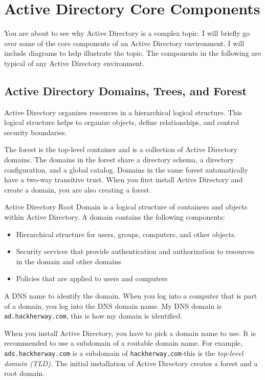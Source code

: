 \section{Active Directory Core Components}
You are about to see why Active Directory is a complex topic. I will briefly go over some of the core components of an Active Directory environment. I will include diagrams to help illustrate the topic. The components in the following are typical of any Active Directory environment.

\subsection{Active Directory Domains, Trees, and Forest}
Active Directory organizes resources in a hierarchical logical structure. This logical structure helps to organize objects, define relationships, and control security boundaries.

The forest is the top-level container and is a collection of Active Directory domains. The domains in the forest share a directory schema, a directory configuration, and a global catalog. Domains in the same forest automatically have a two-way transitive trust. When you first install Active Directory and create a domain, you are also creating a forest.

Active Directory Root Domain is a logical structure of containers and objects within Active Directory. A domain contains the following components:
\begin{itemize}
    \item Hierarchical structure for users, groups, computers, and other objects.
    \item Security services that provide authentication and authorization to resources in the domain and other domains
    \item Policies that are applied to users and computers
\end{itemize}

A DNS name to identify the domain. When you log into a computer that is part of a domain, you log into the DNS domain name. My DNS domain is \texttt{ad.hackherway.com}, this is how my domain is identified. 

When you install Active Directory, you have to pick a domain name to use. It is recommended to use a subdomain of a routable domain name. For example, \texttt{ ads.hackherway.com} is a subdomain of \texttt{hackherway.com}-this is the \textit{ top-level domain (TLD).} The initial installation of Active Directory creates a forest and a root domain.

